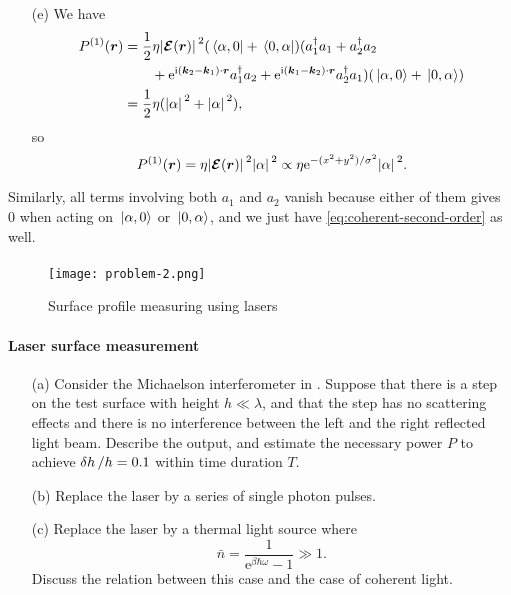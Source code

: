 \documentclass[hyperref, a4paper]{article}
\newcommand*{\ii}{\mathrm{i}}
\newcommand*{\ee}{\mathrm{e}}
\begin{document}
\begin{itemize}
\item[(e)] We have 
\[
    \begin{aligned}
        P^{(1)}(\vb*{r}) &= \frac{1}{2} \eta \abs*{\vb*{\mathcal{E}}(\vb*{r})}^2 (\bra*{\alpha, 0} + \bra*{0, \alpha}) (a_1^\dagger a_1 + a_2^\dagger a_2 \\
        &\quad \quad+ \ee^{\ii (\vb*{k}_2 - \vb*{k}_1) \cdot \vb*{r}} a_1^\dagger a_2 + \ee^{\ii (\vb*{k}_1 - \vb*{k}_2) \cdot \vb*{r}} a_2^\dagger a_1 ) (\ket*{\alpha, 0} + \ket*{0, \alpha}) \\
        &= \frac{1}{2} \eta (\abs*{\alpha}^2 + \abs*{\alpha}^2),
    \end{aligned}
\]
so 
\begin{equation}
    P^{(1)}(\vb*{r}) = \eta \abs*{\vb*{\mathcal{E}}(\vb*{r})}^2 \abs*{\alpha}^2 \propto \eta \ee^{- (x^2 + y^2) / \sigma^2} \abs*{\alpha}^2.
\end{equation}
\end{itemize}
Similarly, all terms involving both $a_1$ and $a_2$ vanish because either of them gives $0$ when acting on $\ket*{\alpha, 0}$ or $\ket*{0, \alpha}$, and we just have \eqref{eq:coherent-second-order} as well.

\paragraph{}

\begin{figure}
    \centering
    \texttt{[image: problem-2.png]}
    \caption{Surface profile measuring using lasers}
    \label{fig:prob-2}
\end{figure}

\paragraph{Laser surface measurement} \begin{itemize}
\item[(a)] Consider the Michaelson interferometer in .
Suppose that there is a step on the test surface with height $h \ll \lambda$, and that the step has no
scattering effects and there is no interference between the left and the right reflected light beam.
Describe the output, and estimate the necessary power $P$ to achieve $\var{h} / h = 0.1$ 
within time duration $T$.
\item[(b)] Replace the laser by a series of single photon pulses.
\item[(c)] Replace the laser by a thermal light source where 
\begin{equation}
    \bar{n} = \frac{1}{\ee^{\beta \hbar \omega} - 1} \gg 1.
\end{equation}
Discuss the relation between this case and the case of coherent light.
\end{itemize}
\end{document}
